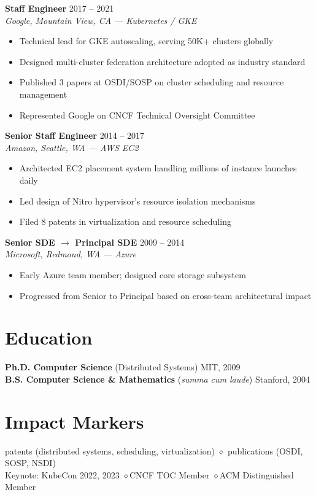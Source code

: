 \documentclass[11pt,a4paper]{article}
\begin{document}
\noindent\textbf{Staff Engineer} \hfill 2017 -- 2021\\
\textit{Google, Mountain View, CA --- Kubernetes / GKE}
\begin{itemize}[leftmargin=1.5em,nosep,label={\color{accent}\textendash}]
\item Technical lead for GKE autoscaling, serving 50K+ clusters globally
\item Designed multi-cluster federation architecture adopted as industry standard
\item Published 3 papers at OSDI/SOSP on cluster scheduling and resource management
\item Represented Google on CNCF Technical Oversight Committee
\end{itemize}
\vspace{0.5em}

\noindent\textbf{Senior Staff Engineer} \hfill 2014 -- 2017\\
\textit{Amazon, Seattle, WA --- AWS EC2}
\begin{itemize}[leftmargin=1.5em,nosep,label={\color{accent}\textendash}]
\item Architected EC2 placement system handling millions of instance launches daily
\item Led design of Nitro hypervisor's resource isolation mechanisms
\item Filed 8 patents in virtualization and resource scheduling
\end{itemize}
\vspace{0.5em}

\noindent\textbf{Senior SDE $\rightarrow$ Principal SDE} \hfill 2009 -- 2014\\
\textit{Microsoft, Redmond, WA --- Azure}
\begin{itemize}[leftmargin=1.5em,nosep,label={\color{accent}\textendash}]
\item Early Azure team member; designed core storage subsystem
\item Progressed from Senior to Principal based on cross-team architectural impact
\end{itemize}

\section{Education}
\noindent\textbf{Ph.D. Computer Science} (Distributed Systems) \hfill MIT, 2009\\
\textbf{B.S. Computer Science \& Mathematics} (\textit{summa cum laude}) \hfill Stanford, 2004

\section{Impact Markers}
 patents (distributed systems, scheduling, virtualization) \quad$\diamond$ publications (OSDI, SOSP, NSDI)\\
Keynote: KubeCon 2022, 2023 \quad$\diamond$\quad CNCF TOC Member \quad$\diamond$\quad ACM Distinguished Member
\end{document}
